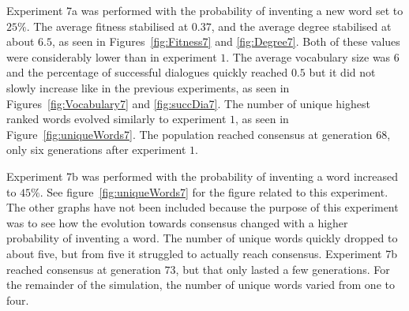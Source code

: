 Experiment 7a was performed with the probability of inventing a new word set to $25\%$. The average fitness stabilised at $0.37$, and the average degree stabilised at about $6.5$, as seen in Figures~\ref{fig:Fitness7} and \ref{fig:Degree7}. Both of these values were considerably lower than in experiment $1$. The average vocabulary size was $6$ and the percentage of successful dialogues quickly reached $0.5$ but it did not slowly increase like in the previous experiments, as seen in Figures~\ref{fig:Vocabulary7} and \ref{fig:succDia7}. The number of unique highest ranked words evolved similarly to experiment $1$, as seen in Figure~\ref{fig:uniqueWords7}. The population reached consensus at generation $68$, only six generations after experiment $1$. 

Experiment 7b was performed with the probability of inventing a word increased to $45\%$. See figure~\ref{fig:uniqueWords7} for the figure related to this experiment. The other graphs have not been included because the purpose of this experiment was to see how the evolution towards consensus changed with a higher probability of inventing a word. The number of unique words quickly dropped to about five, but from five it struggled to actually reach consensus. Experiment 7b reached consensus at generation $73$, but that only lasted a few generations. For the remainder of the simulation, the number of unique words varied from one to four. 


